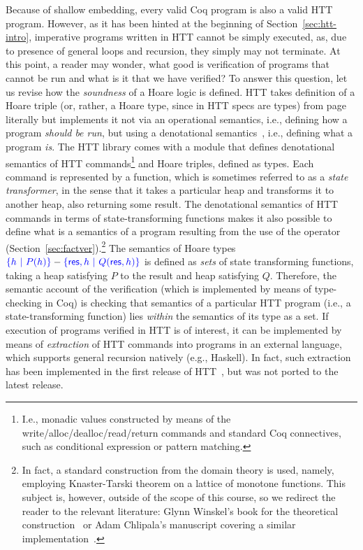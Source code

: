 Because of shallow embedding, every valid Coq program is also a valid
HTT program. However, as it has been hinted at the beginning of
Section~\ref{sec:htt-intro}, imperative programs written in HTT
cannot be simply executed, as, due to presence of general loops and
recursion, they simply may not terminate. At this point, a reader may
wonder, what good is verification of programs that cannot be run and
what is it that we have verified?
To answer this question, let us revise how the \textit{soundness} of a Hoare
logic is defined. HTT takes definition of a Hoare triple (or, rather,
a Hoare type, since in HTT specs are types) from
page~\pageref{pg:triple} literally but implements it not via an
operational semantics, i.e., defining how a program \textit{should be run},
but using a denotational semantics~\cite[Chapter~5]{Winskel:BOOK},
i.e., defining what a program \textit{is}. The HTT library comes with a
module  that defines denotational semantics of HTT
commands\footnote{I.e., monadic values constructed by means of the
write/alloc/dealloc/read/return commands and standard Coq connectives,
such as conditional expression or pattern matching.} and Hoare
triples, defined as types. Each command is represented by a function,
which is sometimes referred to as a \textit{state transformer}, in the sense that
it takes a particular heap and transforms it to another heap, also
returning some result. The denotational semantics of HTT commands in
terms of state-transforming functions makes it also possible to define
what is a semantics of a program resulting from the use of the 
operator (Section~\ref{sec:factver}).\footnote{In fact, a standard
construction from the domain theory is used, namely, employing
Knaster-Tarski theorem on a lattice of monotone functions. This
subject is, however, outside of the scope of this course, so we
redirect the reader to the relevant literature: Glynn Winskel's book
for the theoretical construction~\cite[Chapters~8--10]{Winskel:BOOK}
or Adam Chlipala's manuscript covering a similar
implementation~\cite[\S~7.2]{Chlipala:BOOK}.} The semantics of Hoare
types $\textcolor{blue}{\left\{{h~|~P(h)}\right\}}-\textcolor{blue}{\left\{{\mathsf{res}, h~|~Q(\mathsf{res}, h)}\right\}}$ is defined as
\textit{sets} of state transforming functions, taking a heap satisfying $P$
to the result and heap satisfying $Q$. Therefore, the semantic account
of the verification (which is implemented by means of type-checking in
Coq) is checking that semantics of a particular HTT program (i.e., a
state-transforming function) lies \textit{within} the semantics of its type
as a set.
If execution of programs verified in HTT is of interest, it can be
implemented by means of \textit{extraction} of HTT commands into programs
in an external language, which supports general recursion natively
(e.g., Haskell). In fact, such extraction has been implemented in the
first release of HTT~\cite{Nanevski-al:JFP08}, but was not ported to
the latest release.
